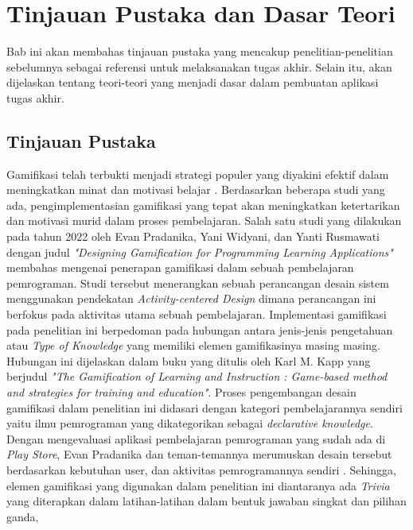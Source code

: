 \chapter{Tinjauan Pustaka dan Dasar Teori}
Bab ini akan membahas tinjauan pustaka yang mencakup penelitian-penelitian sebelumnya sebagai referensi untuk melaksanakan tugas akhir. Selain itu, akan dijelaskan tentang teori-teori yang menjadi dasar dalam pembuatan aplikasi tugas akhir.
\section{Tinjauan Pustaka}
Gamifikasi telah terbukti menjadi strategi populer yang diyakini efektif dalam meningkatkan minat dan motivasi belajar \cite{EnjoyLearningLikeGaming}. 
Berdasarkan beberapa studi yang ada, pengimplementasian gamifikasi yang tepat akan meningkatkan ketertarikan dan motivasi murid dalam proses pembelajaran.
Salah satu studi yang dilakukan pada tahun 2022 oleh Evan Pradanika, Yani Widyani, dan Yanti Rusmawati dengan judul \textit{"Designing Gamification for Programming Learning Applications"} \cite{GamificationInProgLang} membahas mengenai penerapan gamifikasi
dalam sebuah pembelajaran pemrograman. Studi tersebut menerangkan sebuah perancangan desain sistem menggunakan pendekatan \textit{Activity-centered Design} dimana perancangan ini berfokus pada aktivitas utama sebuah pembelajaran\cite{GamificationInProgLang}. 
Implementasi gamifikasi pada penelitian ini berpedoman pada hubungan antara jenis-jenis pengetahuan atau \textit{Type of Knowledge} yang memiliki elemen gamifikasinya masing masing\cite{kapp2012gamification}.
Hubungan ini dijelaskan dalam buku yang ditulis oleh Karl M. Kapp yang berjudul \textit{"The Gamification of Learning and Instruction : Game-based method and strategies for training and education"}\cite{kapp2012gamification}.
Proses pengembangan desain gamifikasi dalam penelitian ini didasari dengan kategori pembelajarannya sendiri yaitu ilmu pemrograman yang dikategorikan sebagai \textit{declarative knowledge}.
Dengan mengevaluasi aplikasi pembelajaran pemrograman yang sudah ada di \textit{Play Store}, Evan Pradanika dan teman-temannya merumuskan desain tersebut berdasarkan kebutuhan user, dan aktivitas pemrogramannya sendiri \cite{GamificationInProgLang}.
Sehingga, elemen gamifikasi yang digunakan dalam penelitian ini diantaranya ada
\textit{Trivia} yang diterapkan dalam latihan-latihan dalam bentuk jawaban singkat dan pilihan ganda,
